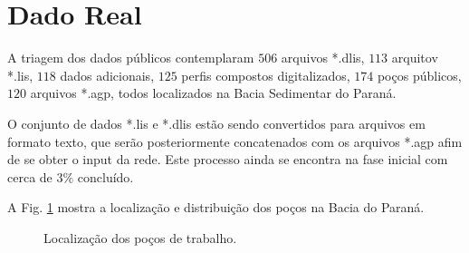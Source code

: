\section{Dado Real}

A triagem dos dados públicos contemplaram  $506$ arquivos *.dlis, $113$ arquitov *.lis, $118$ dados adicionais, $125$ perfis compostos digitalizados, $174$ poços públicos, $120$ arquivos *.agp, todos localizados na Bacia Sedimentar do Paraná. 

O conjunto de dados *.lis e *.dlis estão sendo convertidos para arquivos em formato texto, que serão posteriormente concatenados  com os arquivos *.agp afim de se obter o input da rede. Este processo ainda se encontra na fase inicial com cerca de $3\%$ concluído.

A Fig. \ref{real} mostra a localização e distribuição dos poços na Bacia do Paraná.

\begin{figure}[H]
	\centering
	\setlength{\fboxsep}{8pt}
	\setlength{\fboxrule}{0.1pt}
	\caption{Localização dos poços de trabalho.}
	\label{real}
\end{figure}


